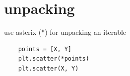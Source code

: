 \section{unpacking}
use asterix (*) for unpacking an iterable
\begin{verbatim}
    points = [X, Y]
    plt.scatter(*points)
    plt.scatter(X, Y)
\end{verbatim}